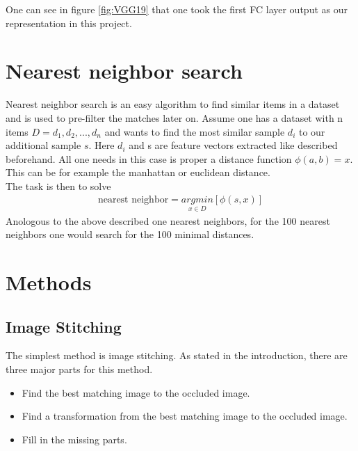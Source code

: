 \documentclass[
     11pt,         %
     a4paper,      %
     oneside,
     ]{article}
\begin{document}
One can see in figure \ref{fig:VGG19} that one took the first FC layer output as our representation in this project.


\section{Nearest neighbor search}
Nearest neighbor search is an easy algorithm to find similar items in a dataset and is used to pre-filter the matches later on. Assume one has a dataset with n items $D = {d_1, d_2, ..., d_n}$ and wants to find the most similar sample $d_i$ to our additional sample $s$. Here $d_i$ and s are feature vectors extracted like described beforehand. All one needs in this case is proper a distance function $\phi(a,b) = x$. This can be for example the manhattan or euclidean distance. \\
The task is then to solve
\begin{align*}
  \text{nearest neighbor} = \underset{x \in D}{argmin} [\phi(s,x)]
\end{align*}
Anologous to the above described one nearest neighbors, for the 100 nearest neighbors one would search for the 100 minimal distances.



\section{Methods}
\subsection{Image Stitching}
The simplest method is image stitching. As stated in the introduction, there are three major parts for this method.
\begin{itemize}
  \item Find the best matching image to the occluded image.
  \item Find a transformation from the best matching image to the occluded image.
  \item Fill in the missing parts.
\end{itemize}
\end{document}
